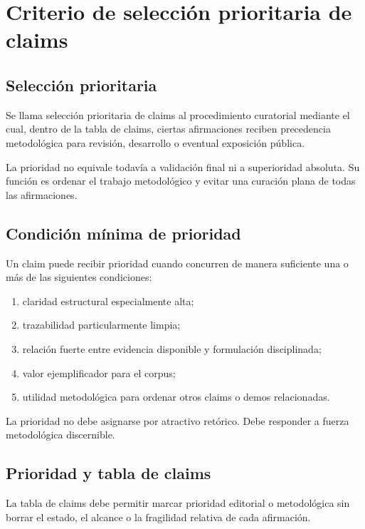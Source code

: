 \chapter{Criterio de selección prioritaria de claims}

\section{Selección prioritaria}
\begin{definition}
Se llama selección prioritaria de claims al procedimiento curatorial mediante el cual, dentro de la tabla de claims, ciertas afirmaciones reciben precedencia metodológica para revisión, desarrollo o eventual exposición pública.
\end{definition}

\begin{observation}
La prioridad no equivale todavía a validación final ni a superioridad absoluta. Su función es ordenar el trabajo metodológico y evitar una curación plana de todas las afirmaciones.
\end{observation}

\section{Condición mínima de prioridad}
\begin{definition}
Un claim puede recibir prioridad cuando concurren de manera suficiente una o más de las siguientes condiciones:
\begin{enumerate}
  \item claridad estructural especialmente alta;
  \item trazabilidad particularmente limpia;
  \item relación fuerte entre evidencia disponible y formulación disciplinada;
  \item valor ejemplificador para el corpus;
  \item utilidad metodológica para ordenar otros claims o demos relacionadas.
\end{enumerate}
\end{definition}

\begin{observation}
La prioridad no debe asignarse por atractivo retórico. Debe responder a fuerza metodológica discernible.
\end{observation}

\section{Prioridad y tabla de claims}
\begin{definition}
La tabla de claims debe permitir marcar prioridad editorial o metodológica sin borrar el estado, el alcance o la fragilidad relativa de cada afirmación.
\end{definition}


